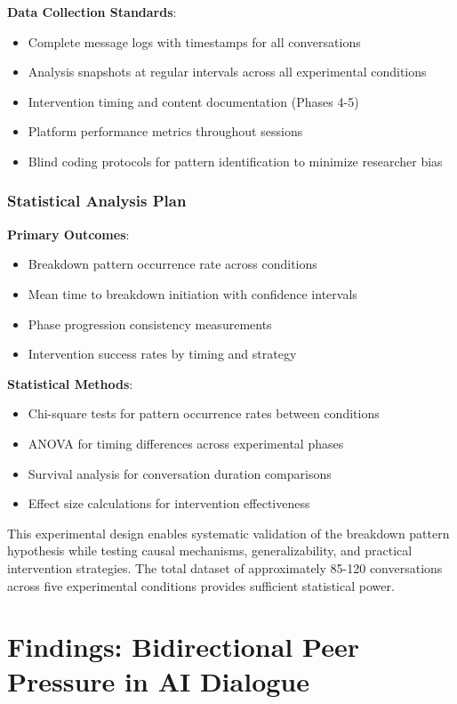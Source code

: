 \documentclass[11pt,letterpaper]{article}
\begin{document}
\textbf{Data Collection Standards}:
\begin{itemize}
    \item Complete message logs with timestamps for all conversations
    \item Analysis snapshots at regular intervals across all experimental conditions
    \item Intervention timing and content documentation (Phases 4-5)
    \item Platform performance metrics throughout sessions
    \item Blind coding protocols for pattern identification to minimize researcher bias
\end{itemize}

\subsubsection{Statistical Analysis Plan}

\textbf{Primary Outcomes}:
\begin{itemize}
    \item Breakdown pattern occurrence rate across conditions
    \item Mean time to breakdown initiation with confidence intervals
    \item Phase progression consistency measurements
    \item Intervention success rates by timing and strategy
\end{itemize}

\textbf{Statistical Methods}:
\begin{itemize}
    \item Chi-square tests for pattern occurrence rates between conditions
    \item ANOVA for timing differences across experimental phases
    \item Survival analysis for conversation duration comparisons
    \item Effect size calculations for intervention effectiveness
\end{itemize}

This experimental design enables systematic validation of the breakdown pattern hypothesis while testing causal mechanisms, generalizability, and practical intervention strategies. The total dataset of approximately 85-120 conversations across five experimental conditions provides sufficient statistical power.

\section{Findings: Bidirectional Peer Pressure in AI Dialogue}
\end{document}
